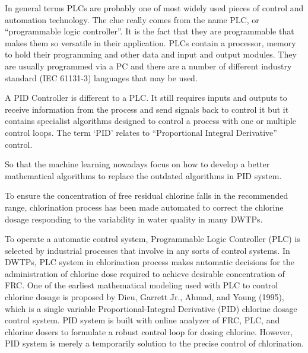 In general terms PLCs are probably one of most widely used pieces of control and automation technology. The clue really comes from the name PLC, or “programmable logic controller”. It is the fact that they are programmable that makes them so versatile in their application. PLCs contain a processor, memory to hold their programming and other data and input and output modules. They are usually programmed via a PC and there are a number of different industry standard (IEC 61131-3) languages that may be used.

A PID Controller is different to a PLC. It still requires inputs and outputs to receive information from the process and send signals back to control it but it contains specialist algorithms designed to control a process with one or multiple control loops. The term ‘PID’ relates to “Proportional Integral Derivative” control. 

So that the machine learning nowadays focus on how to develop a better mathematical algorithms to replace the outdated algorithms in PID system.

To ensure the concentration of free residual chlorine falls in the recommended range, chlorination process has been made automated to correct the chlorine dosage responding to the variability in water quality in many DWTPs. 

To operate a automatic control system, Programmable Logic Controller (PLC) is selected by industrial processes that involve in any sorts of control systems. In DWTPs, PLC system in chlorination process makes automatic decisions for the administration of chlorine dose required to achieve desirable concentration of FRC. One of the earliest mathematical modeling used with PLC to control chlorine dosage is proposed by Dieu, Garrett Jr., Ahmad, and Young (1995), which is a single variable Proportional-Integral Derivative (PID) chlorine dosage control system. PID system is built with online analyzer of FRC, PLC, and chlorine dosers to formulate a robust control loop for dosing chlorine. However, PID system is merely a temporarily solution to the precise control of chlorination. 

%

